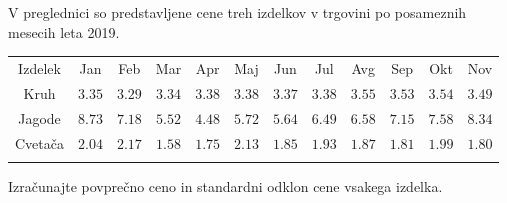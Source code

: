         
            ~\\~


        
        
            \begin{naloga}
             
                V preglednici so predstavljene cene treh izdelkov v trgovini po posameznih mesecih leta 2019. 

                 \begin{table}[H]
                     \centering
                     \begin{tabular}{||c|c|c|c|c|c|c|c|c|c|c|c||} 
                     \hhline{|t:============:t|}
                     \rowcolor[rgb]{0.843,0.718,0.718} 
                     Izdelek  & Jan & Feb & Mar & Apr & Maj & Jun & Jul & Avg & Sep & Okt & Nov    \\ 
                     \hhline{|:============:|}
                     Kruh  & $3.35$ & $3.29$ & $3.34$ & $3.38$ & $3.38$ & $3.37$ & $3.38$ & $3.55$ & $3.53$ & $3.54$ & $3.49$ \\ 
                     \hhline{|:============:|}
                     Jagode & $8.73$ & $7.18$ & $5.52$ & $4.48$ & $5.72$ & $5.64$ & $6.49$ & $6.58$ & $7.15$ & $7.58$ & $8.34$ \\ 
                     \hhline{|:============:|}
                     Cvetača & $2.04$ & $2.17$ & $1.58$ & $1.75$ & $2.13$ & $1.85$ & $1.93$ & $1.87$ & $1.81$ & $1.99$ & $1.80$ \\ 
                     \hhline{|b:============:b|}
                     \end{tabular}
                 \end{table}

                 Izračunajte povprečno ceno in standardni odklon cene vsakega izdelka.

             
                \end{naloga}
 


     
        
